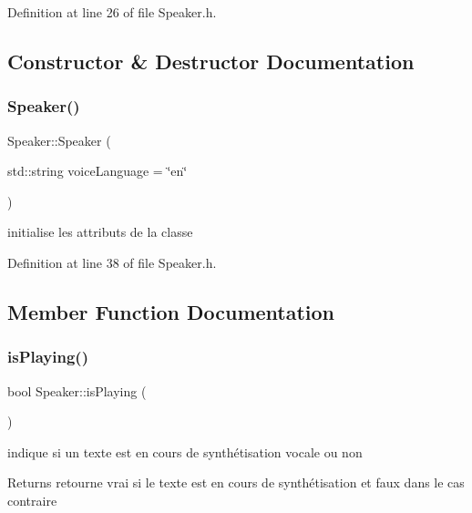 Definition at line 26 of file Speaker.\+h.



\subsection{Constructor \& Destructor Documentation}
\mbox{\label{class_speaker_ad3ab39863028f1f841895b9399fd6941}} 
\subsubsection{\texorpdfstring{Speaker()}{Speaker()}}
{\footnotesize\ttfamily Speaker\+::\+Speaker (\begin{DoxyParamCaption}\item[{std\+::string}]{voice\+Language = {\ttfamily \char`\"{}en\char`\"{}} }\end{DoxyParamCaption})\hspace{0.3cm}{\ttfamily [inline]}}



initialise les attributs de la classe 



Definition at line 38 of file Speaker.\+h.



\subsection{Member Function Documentation}
\mbox{\label{class_speaker_a81aeeedaeecbb85d0fb103906e24991a}} 
\subsubsection{\texorpdfstring{is\+Playing()}{isPlaying()}}
{\footnotesize\ttfamily bool Speaker\+::is\+Playing (\begin{DoxyParamCaption}{ }\end{DoxyParamCaption})}



indique si un texte est en cours de synthétisation vocale ou non 

\begin{DoxyReturn}{Returns}
retourne vrai si le texte est en cours de synthétisation et faux dans le cas contraire 
\end{DoxyReturn}


